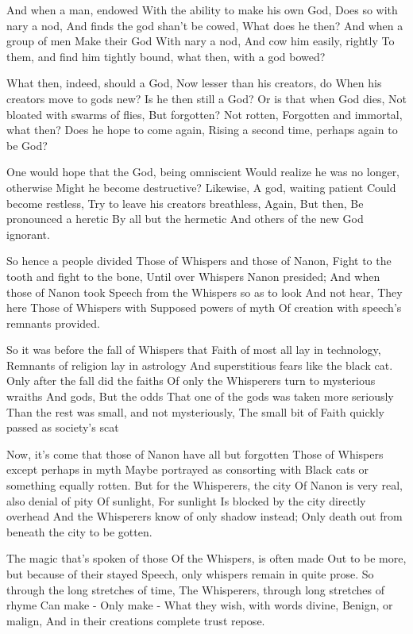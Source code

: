 And when a man, endowed With the ability to make his own God, Does so with nary a nod, And finds the god shan't be cowed, What does he then? And when a group of men Make their God With nary a nod, And cow him easily, rightly To them, and find him tightly bound, what then, with a god bowed?

What then, indeed, should a God, Now lesser than his creators, do When his creators move to gods new? Is he then still a God? Or is that when God dies, Not bloated with swarms of flies, But forgotten? Not rotten, Forgotten and immortal, what then? Does he hope to come again, Rising a second time, perhaps again to be God?

One would hope that the God, being omniscient Would realize he was no longer, otherwise Might he become destructive? Likewise, A god, waiting patient Could become restless, Try to leave his creators breathless, Again, But then, Be pronounced a heretic By all but the hermetic And others of the new God ignorant.

So hence a people divided Those of Whispers and those of Nanon, Fight to the tooth and fight to the bone, Until over Whispers Nanon presided; And when those of Nanon took Speech from the Whispers so as to look And not hear, They here Those of Whispers with Supposed powers of myth Of creation with speech's remnants provided.

So it was before the fall of Whispers that Faith of most all lay in technology, Remnants of religion lay in astrology And superstitious fears like the black cat. Only after the fall did the faiths Of only the Whisperers turn to mysterious wraiths And gods, But the odds That one of the gods was taken more seriously Than the rest was small, and not mysteriously, The small bit of Faith quickly passed as society's scat

Now, it's come that those of Nanon have all but forgotten Those of Whispers except perhaps in myth Maybe portrayed as consorting with Black cats or something equally rotten. But for the Whisperers, the city Of Nanon is very real, also denial of pity Of sunlight, For sunlight Is blocked by the city directly overhead And the Whisperers know of only shadow instead; Only death out from beneath the city to be gotten.

The magic that's spoken of those Of the Whispers, is often made Out to be more, but because of their stayed Speech, only whispers remain in quite prose. So through the long stretches of time, The Whisperers, through long stretches of rhyme Can make - Only make - What they wish, with words divine, Benign, or malign, And in their creations complete trust repose.

